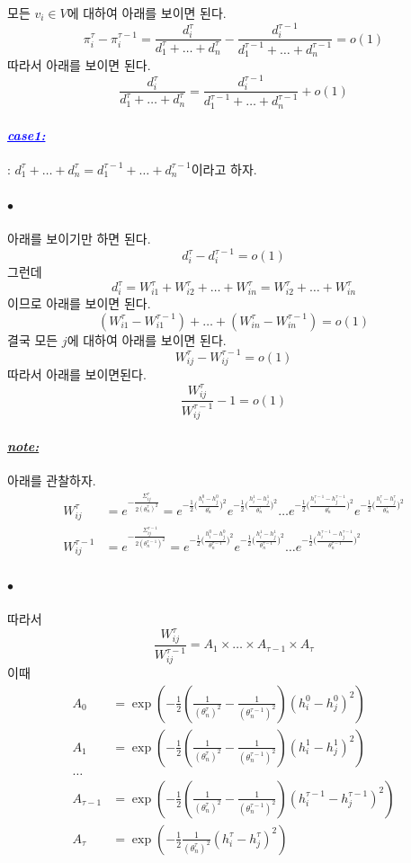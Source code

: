 \documentclass[12pt,oneside,english,a4paper]{article}
\def\ck{\paragraph{\Large$\bullet$}\Large}
\def\note{\paragraph{\Large\textit{\underline{note:}}}\Large}
\newcommand{\parablue}[1]{\paragraph{\Large\textcolor{blue}{\it\underline{\textbf{#1:}}}}\Large}
\begin{document}
\proof 
모든 $v_i\in V$에 대하여 아래를 보이면 된다. 
\[
\pi_i^{\tau}-\pi_i^{\tau-1}=\frac{d_i^{\tau}}{d_1^{\tau}+\dots+d_n^{\tau}}-\frac{d_i^{\tau-1}}{d_1^{\tau-1}+\dots+d_n^{\tau-1}}=o(1)
\]
따라서 아래를 보이면 된다. 
\[
\frac{d_i^{\tau}}{d_1^{\tau}+\dots+d_n^{\tau}}=\frac{d_i^{\tau-1}}{d_1^{\tau-1}+\dots+d_n^{\tau-1}}+o(1)
\]

\parablue{case1} : $d_1^{\tau}+\dots+d_n^{\tau}=d_1^{\tau-1}+\dots+d_n^{\tau-1}$이라고 하자. 
\ck 아래를 보이기만 하면 된다. 
\[
d_i^{\tau}-d_i^{\tau-1}=o(1)
\]
그런데 
\[
d_i^{\tau}=W_{i1}^{\tau}+W_{i2}^{\tau}+\dots+W_{in}^{\tau}=W_{i2}^{\tau}+\dots+W_{in}^{\tau}
\]
이므로 아래를 보이면 된다. 
\[
(W_{i1}^{\tau}-W_{i1}^{\tau-1})+\dots+(W_{in}^{\tau}-W_{in}^{\tau-1})=o(1)
\]
결국 모든 $j$에 대하여 아래를 보이면 된다. 
\[
W_{ij}^{\tau}-W_{ij}^{\tau-1}=o(1)
\]
따라서 아래를 보이면된다. 
\[
\frac{W_{ij}^{\tau}}{W_{ij}^{\tau-1}}-1=o(1)
\]

\note 
아래를 관찰하자. 
\begin{align*}
W_{ij}^{\tau}&=e^{-\frac{\Sigma_{ij}^{\tau}}{2(\theta_n^{\tau})^2}}
=e^{-\frac{1}{2}\big(\frac{h_i^0-h_j^0}{\theta_n^{\tau}}\big)^2}
e^{-\frac{1}{2}\big(\frac{h_i^1-h_j^1}{\theta_n^{\tau}}\big)^2}
\dots
e^{-\frac{1}{2}\big(\frac{h_i^{\tau-1}-h_j^{\tau-1}}{\theta_n^{\tau}}\big)^2}
e^{-\frac{1}{2}\big(\frac{h_i^\tau-h_j^\tau}{\theta_n^{\tau}}\big)^2} \\
W_{ij}^{\tau-1}&=e^{-\frac{\Sigma_{ij}^{\tau-1}}{2(\theta_n^{\tau-1})^2}}
=e^{-\frac{1}{2}\big(\frac{h_i^0-h_j^0}{\theta_n^{\tau-1}}\big)^2}
e^{-\frac{1}{2}\big(\frac{h_i^1-h_j^1}{\theta_n^{\tau-1}}\big)^2}
\dots
e^{-\frac{1}{2}\big(\frac{h_i^{\tau-1}-h_j^{\tau-1}}{\theta_n^{\tau-1}}\big)^2}
\end{align*}

\ck 따라서 
\[
\frac{W_{ij}^{\tau}}{W_{ij}^{\tau-1}}
=A_1 \times \dots \times A_{\tau-1}\times A_\tau
\]
이때 
\begin{align*}
A_0&=\exp\left(-\frac{1}{2}\left(\frac{1}{(\theta_n^\tau)^2}-\frac{1}{(\theta_n^{\tau-1})^2}\right)(h_i^0-h_j^0)^2\right) \\
A_1&=\exp\left(-\frac{1}{2}\left(\frac{1}{(\theta_n^\tau)^2}-\frac{1}{(\theta_n^{\tau-1})^2}\right)(h_i^1-h_j^1)^2\right) \\
\dots \\
A_{\tau-1}&=\exp\left(-\frac{1}{2}\left(\frac{1}{(\theta_n^\tau)^2}-\frac{1}{(\theta_n^{\tau-1})^2}\right)(h_i^{\tau-1}-h_j^{\tau-1})^2\right) \\ 
A_{\tau}&=\exp\left(-\frac{1}{2}\frac{1}{(\theta_n^\tau)^2}(h_i^{\tau}-h_j^{\tau})^2\right)
\end{align*}
\end{document}
